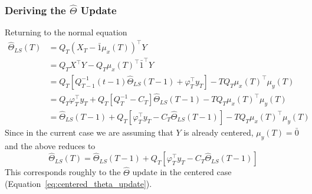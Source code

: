 \subsubsection{Deriving the $\hat\Theta$ Update}
Returning to the normal equation
\begin{align}
  \hat\Theta_{LS}(T) &= Q_T (X_T - \bar{1} \mu_x(T))^\top Y \\
                     &= Q_TX^\top Y - Q_T \mu_x(T)^\top\bar{1}^\top Y \\
                     &= Q_T\left[Q_{T-1}^{-1}(t-1)\hat\Theta_{LS}(T-1) + \varphi_T^\top y_T\right] - TQ_T\mu_x(T)^\top \mu_y(T) \\
                     &= Q_T \varphi_T^\top y_T + Q_T\left[Q_{T}^{-1} - C_T\right]\hat\Theta_{LS}(T-1) - TQ_T\mu_x(T)^\top\mu_y(T) \\
                     &= \hat\Theta_{LS}(T-1) + Q_T\left[\varphi_T^\top y_T - C_T\hat\Theta_{LS}(T-1)\right] - TQ_T\mu_x(T)^\top \mu_y(T) \label{eq:uncentered_x_theta_with_correction}
\end{align}
Since in the current case we are assuming that $Y$ is already centered,
$\mu_y(T) = \bar{0}$ and the above reduces to
\begin{equation}
  \hat\Theta_{LS}(T) = \hat\Theta_{LS}(T-1) + Q_T\left[\varphi_T^\top y_T - C_T\hat\Theta_{LS}(T-1)\right] \label{eq:uncentered_x_theta_update}
\end{equation}
This corresponds roughly to the $\hat\Theta$ update in the centered case (Equation~\ref{eq:centered_theta_update}).

